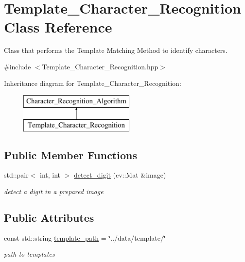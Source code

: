 \hypertarget{class_template___character___recognition}{}\section{Template\+\_\+\+Character\+\_\+\+Recognition Class Reference}
\label{class_template___character___recognition}


Class that performs the Template Matching Method to identify characters.  




{\ttfamily \#include $<$Template\+\_\+\+Character\+\_\+\+Recognition.\+hpp$>$}

Inheritance diagram for Template\+\_\+\+Character\+\_\+\+Recognition\+:\begin{figure}[H]
\begin{center}
\leavevmode
\includegraphics[height=2.000000cm]{class_template___character___recognition}
\end{center}
\end{figure}
\subsection*{Public Member Functions}
\begin{DoxyCompactItemize}
\item 
\mbox{\label{class_template___character___recognition_af41bc392058896b69802f690e42661dc}} 
std\+::pair$<$ int, int $>$ \mbox{\hyperlink{class_template___character___recognition_af41bc392058896b69802f690e42661dc}{detect\+\_\+digit}} (cv\+::\+Mat \&image)
\begin{DoxyCompactList}\small\item\em detect a digit in a prepared image \end{DoxyCompactList}\end{DoxyCompactItemize}
\subsection*{Public Attributes}
\begin{DoxyCompactItemize}
\item 
\mbox{\label{class_template___character___recognition_aa4cb4d3779f7d7a65ae5811f78be880b}} 
const std\+::string \mbox{\hyperlink{class_template___character___recognition_aa4cb4d3779f7d7a65ae5811f78be880b}{template\+\_\+path}} = \char`\"{}../data/template/\char`\"{}
\begin{DoxyCompactList}\small\item\em path to templates \end{DoxyCompactList}\end{DoxyCompactItemize}


